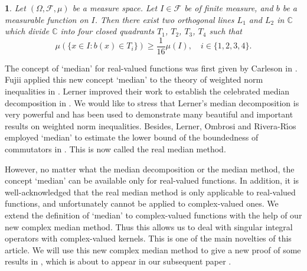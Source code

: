 \documentclass[oneside,english,a4wide]{amsart}
\numberwithin{equation}{section}
\numberwithin{figure}{section}
\theoremstyle{plain}
\newtheorem{thm}{\protect\theoremname}[section]
\theoremstyle{plain}
\theoremstyle{definition}
\theoremstyle{plain}
\theoremstyle{remark}
\theoremstyle{definition}
\theoremstyle{remark}
\theoremstyle{definition}
\providecommand{\theoremname}{Theorem}
\newcommand{\8}{\infty}
\begin{document}
\begin{thm}\label{divideS}
	Let $(\Omega,\mathcal{F},\mu)$ be a measure space. Let $I\in \mathcal{F}$ be of finite measure, and $b$ be a measurable function on $I$.
	Then there exist two orthogonal lines $L_1$ and $L_2$ in $\mathbb{C}$ which divide $\mathbb{C}$ into four closed quadrants $T_1$, $T_2$, $T_3$, $T_4$ such that
	\begin{equation*}
		\mu(\{x\in I:b(x)\in T_i\})\ge \frac{1}{16}\mu(I),\quad i\in \{1,2,3,4\}.
	\end{equation*}
\end{thm}
 The concept of `median' for real-valued functions was first given by Carleson in \cite{CL1980}. Fujii applied this new concept `median' to the theory of weighted norm inequalities in \cite{FN1991}. Lerner improved their work to establish the celebrated median decomposition in \cite{LAK10}. We would like to stress that Lerner's median decomposition is very powerful and has been used to demonstrate many beautiful and important results on weighted norm inequalities. Besides, Lerner, Ombrosi and Rivera-R\'{\i}os employed `median' to estimate the lower bound of the boundedness of commutators in \cite{LOR}. This is now called the real median method.

However, no matter what the median decomposition or the median method, the concept `median' can be available only for real-valued functions. In addition, it is well-acknowledged that the real median method is only applicable to real-valued functions, and unfortunately cannot be applied to complex-valued ones. We extend the definition of `median' to complex-valued functions with the help of our new complex median method. Thus this allows us to deal with singular integral operators with complex-valued kernels. This is one of the main novelties of this article. We will use this new complex median method to give a new proof of some results in \cite{TH3}, which is about to appear in our subsequent paper \cite{WZ3}.

\end{document}
